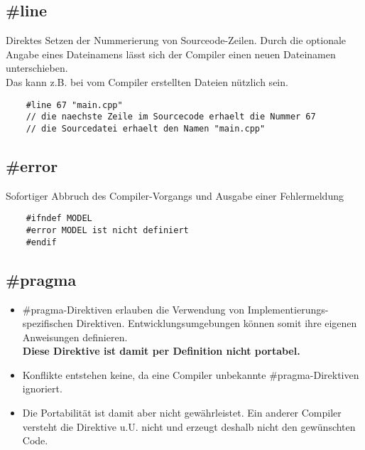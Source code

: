 \subsection{\#line}
\label{sec:line}
Direktes Setzen der Nummerierung von Sourceode-Zeilen. Durch die optionale Angabe eines Dateinamens lässt sich der Compiler einen neuen Dateinamen unterschieben.\\
Das kann z.B. bei vom Compiler erstellten Dateien nützlich sein.
\noindent
\begin{minipage}{\linewidth}
	\begin{lstlisting}
	#line 67 "main.cpp"
	// die naechste Zeile im Sourcecode erhaelt die Nummer 67
	// die Sourcedatei erhaelt den Namen "main.cpp"
	\end{lstlisting}
\end{minipage}

\subsection{\#error}
\label{sec:error}
Sofortiger Abbruch des Compiler-Vorgangs und Ausgabe einer Fehlermeldung
\noindent
\begin{minipage}{\linewidth}
	\begin{lstlisting}
	#ifndef MODEL
	#error MODEL ist nicht definiert
	#endif
	\end{lstlisting}
\end{minipage}

\subsection{\#pragma}
\label{sec:pragma}
\begin{itemize}
	\item \#pragma-Direktiven erlauben die Verwendung von Implementierungs-spezifischen Direktiven. Entwicklungsumgebungen können somit ihre eigenen Anweisungen definieren.\\
	\textbf{Diese Direktive ist damit per Definition nicht portabel.}
	\item Konflikte entstehen keine, da eine Compiler unbekannte \#pragma-Direktiven ignoriert.
	\item Die Portabilität ist damit aber nicht gewährleistet. Ein anderer Compiler versteht die Direktive u.U. nicht und erzeugt deshalb nicht den gewünschten Code.
\end{itemize}

